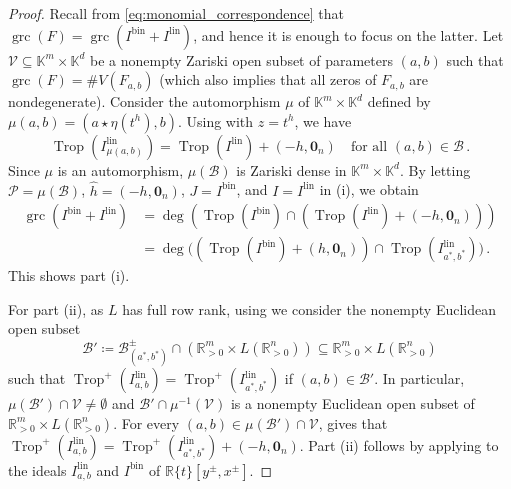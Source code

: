 \documentclass[11pt,reqno,a4paper]{amsart}
\numberwithin{equation}{section}
\theoremstyle{theoremstyle}
\theoremstyle{examplestyle}
\newcommand{\RR}{\mathbb{R}}
\newcommand{\lin}{{\mathrm{lin}}}
\newcommand{\bin}{{\mathrm{bin}}}
\DeclareMathOperator{\grc}{grc}
\DeclareMathOperator{\Trop}{Trop}
\begin{document}
\begin{proof}
 Recall  from  \eqref{eq:monomial_correspondence} that 
$\grc(F)=\grc(I^{\bin}+I^{\lin})$, and hence it is enough to focus on the latter.  Let $\mathcal{V}\subseteq \mathbb{K}^m\times \mathbb{K}^d$ be   a nonempty Zariski open subset  of parameters 
$(a,b)$ such that $\grc(F)=\#V(F_{a,b})$ (which also implies that all zeros of $F_{a,b}$ are nondegenerate).
Consider the automorphism $\mu$ of $\mathbb{K}^m\times \mathbb{K}^d$ defined by $\mu(a,b)=(a\star \eta(t^h),b)$. 
Using  with $z=t^h$, 
we have
\[\Trop(I^{\lin}_{\mu(a,b)}) = \Trop(I^{\lin}) + (-h,\mathbf{0}_n)\quad\text{for all }(a,b) \in \mathcal{B}\, .\]
Since $\mu$ is an automorphism, $\mu( \mathcal{B})$ is Zariski dense in $\mathbb{K}^m\times \mathbb{K}^d$. By letting $\mathcal{P}=\mu( \mathcal{B})$, $\hat{h}=(-h,\mathbf{0}_n)$, $J=I^{\bin}$, and $I=I^{\lin}$ in (i), we obtain
\begin{align*}
    \grc(I^{\bin}+I^{\lin}) & =  \deg(\Trop(I^{\bin}) \cap (\Trop(  I^{\lin})+(-h,\mathbf{0}_n)))
  \\
    &= \deg\big((\Trop(I^{\bin})+(h,\mathbf{0}_{n} )) \cap \Trop(I^{\lin}_{a^*,b^*})\big)\, .
\end{align*} 
This shows  part  (i). 


For part (ii), as $L$ has full row rank, using  we consider the nonempty Euclidean open subset  
\[\mathcal{B}'\coloneqq\mathcal{B}_{(a^*,b^*)}^\pm \cap (\RR^{m}_{>0} \times L(\RR_{>0}^{n})) \subseteq \RR^{m}_{>0} \times L(\RR_{>0}^{n})\] 
  such that $\Trop^+(I^{\lin}_{a,b}) = \Trop^+(I^{\lin}_{a^*,b^*})$ if $(a,b)\in \mathcal{B}'$. 
 In particular, 
  $\mu(\mathcal{B}') \cap \mathcal{V}\neq \emptyset$ and $\mathcal{B}' \cap \mu^{-1}(\mathcal{V})$ is a nonempty Euclidean open subset of $\RR^{m}_{>0} \times L(\RR_{>0}^{n})$. For every
 $(a,b) \in \mu(\mathcal{B}') \cap \mathcal{V}$,
   gives that $\Trop^+(I^{\lin}_{a,b}) = \Trop^+(I^{\lin}_{a^*,b^*})  + (-h,\mathbf{0}_n)$. Part (ii) follows by applying   to the ideals $I^{\lin}_{a,b}$ and $I^{\bin}$ of $\RR\{t\}[y^\pm,x^\pm]$. \end{proof} 
\end{document}
